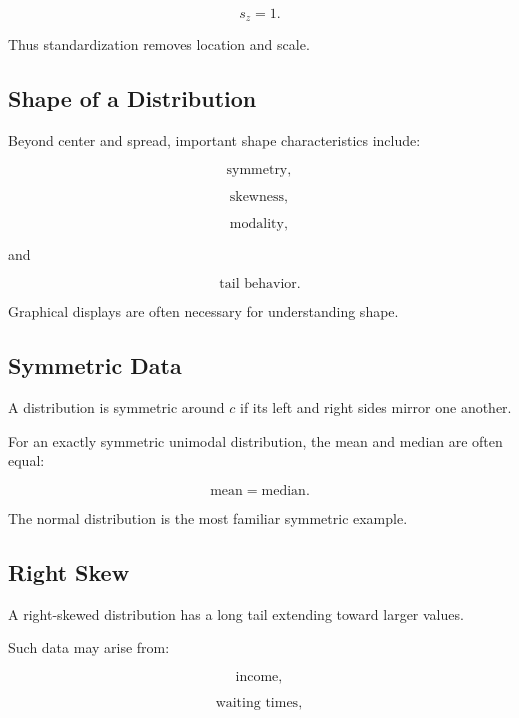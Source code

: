 \[
\boxed{
s_z=1.
}
\]

Thus standardization removes location and scale.

\subsection{Shape of a Distribution}
\label{subsec:shape-distribution-descriptive}

Beyond center and spread, important shape characteristics include:

\[
\boxed{
\text{symmetry},
}
\]

\[
\boxed{
\text{skewness},
}
\]

\[
\boxed{
\text{modality},
}
\]

and

\[
\boxed{
\text{tail behavior}.
}
\]

Graphical displays are often necessary for understanding shape.

\subsection{Symmetric Data}
\label{subsec:symmetric-data}

A distribution is symmetric around \(c\) if its left and right sides
mirror one another.

For an exactly symmetric unimodal distribution, the mean and median are
often equal:

\[
\boxed{
\text{mean}
=
\text{median}.
}
\]

The normal distribution is the most familiar symmetric example.

\subsection{Right Skew}
\label{subsec:right-skew}

A right-skewed distribution has a long tail extending toward larger
values.

Such data may arise from:

\[
\text{income},
\]

\[
\text{waiting times},
\]

